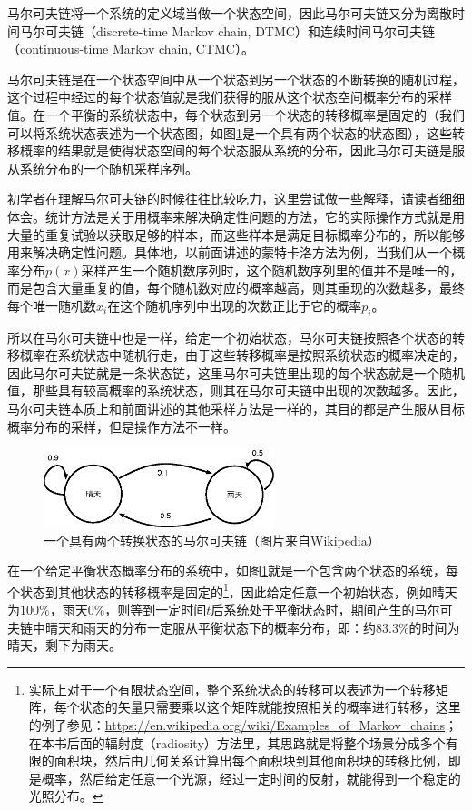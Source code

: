 马尔可夫链将一个系统的定义域当做一个状态空间，因此马尔可夫链又分为离散时间马尔可夫链（discrete-time Markov chain, DTMC）和连续时间马尔可夫链（continuous-time Markov chain, CTMC）。

马尔可夫链是在一个状态空间中从一个状态到另一个状态的不断转换的随机过程，这个过程中经过的每个状态值就是我们获得的服从这个状态空间概率分布的采样值。在一个平衡的系统状态中，每个状态到另一个状态的转移概率是固定的（我们可以将系统状态表述为一个状态图，如图\ref{f:mc-markov-chain}是一个具有两个状态的状态图），这些转移概率的结果就是使得状态空间的每个状态服从系统的分布，因此马尔可夫链是服从系统分布的一个随机采样序列。

初学者在理解马尔可夫链的时候往往比较吃力，这里尝试做一些解释，请读者细细体会。统计方法是关于用概率来解决确定性问题的方法，它的实际操作方式就是用大量的重复试验以获取足够的样本，而这些样本是满足目标概率分布的，所以能够用来解决确定性问题。具体地，以前面讲述的蒙特卡洛方法为例，当我们从一个概率分布$p(x)$采样产生一个随机数序列时，这个随机数序列里的值并不是唯一的，而是包含大量重复的值，每个随机数对应的概率越高，则其重现的次数越多，最终每个唯一随机数$x_i$在这个随机序列中出现的次数正比于它的概率$p_i$。

所以在马尔可夫链中也是一样，给定一个初始状态，马尔可夫链按照各个状态的转移概率在系统状态中随机行走，由于这些转移概率是按照系统状态的概率决定的，因此马尔可夫链就是一条状态链，这里马尔可夫链里出现的每个状态就是一个随机值，那些具有较高概率的系统状态，则其在马尔可夫链中出现的次数越多。因此，马尔可夫链本质上和前面讲述的其他采样方法是一样的，其目的都是产生服从目标概率分布的采样，但是操作方法不一样。

\begin{figure}
	\sidecaption
	\includegraphics[width=0.6\textwidth]{figures/mc/markov-chain-example}
	\caption{一个具有两个转换状态的马尔可夫链（图片来自Wikipedia）}
	\label{f:mc-markov-chain}
\end{figure}

在一个给定平衡状态概率分布的系统中，如图\ref{f:mc-markov-chain}就是一个包含两个状态的系统，每个状态到其他状态的转移概率是固定的\footnote{实际上对于一个有限状态空间，整个系统状态的转移可以表述为一个转移矩阵，每个状态的矢量只需要乘以这个矩阵就能按照相关的概率进行转移，这里的例子参见：\url{https://en.wikipedia.org/wiki/Examples_of_Markov_chains}；在本书后面的辐射度（radiosity）方法里，其思路就是将整个场景分成多个有限的面积块，然后由几何关系计算出每个面积块到其他面积块的转移比例，即是概率，然后给定任意一个光源，经过一定时间的反射，就能得到一个稳定的光照分布。}，因此给定任意一个初始状态，例如晴天为$100\%$，雨天$0\%$，则等到一定时间$t$后系统处于平衡状态时，期间产生的马尔可夫链中晴天和雨天的分布一定服从平衡状态下的概率分布，即：约$83.3\%$的时间为晴天，剩下为雨天。

